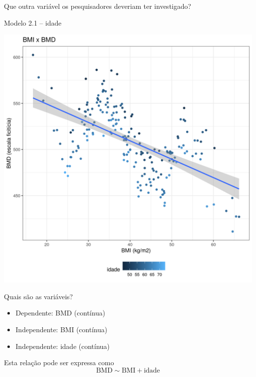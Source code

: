\documentclass{beamer}
\begin{document}
\begin{frame}{\scriptsize }
  \begin{center}
    Que outra variável os pesquisadores deveriam ter investigado?
  \end{center}
\end{frame}

\begin{frame}{\scriptsize Modelo 2.1 -- idade}
  \begin{center}
    \includegraphics[height=.9\textheight]{Cap31-32/pratica-rlm2_1}
  \end{center}
\end{frame}

\begin{frame}{\scriptsize Quais são as variáveis?}
  \begin{itemize}
    \footnotesize
  \item Dependente: BMD (contínua)
  \item Independente: BMI (contínua)
  \item Independente: idade (contínua)
  \end{itemize}
  \vfill
  \begin{block}{Esta relação pode ser expressa como}
    \footnotesize
    \begin{displaymath}
      \text{BMD} \sim \text{BMI} + \text{idade}
    \end{displaymath}
  \end{block}
\end{frame}
\end{document}
